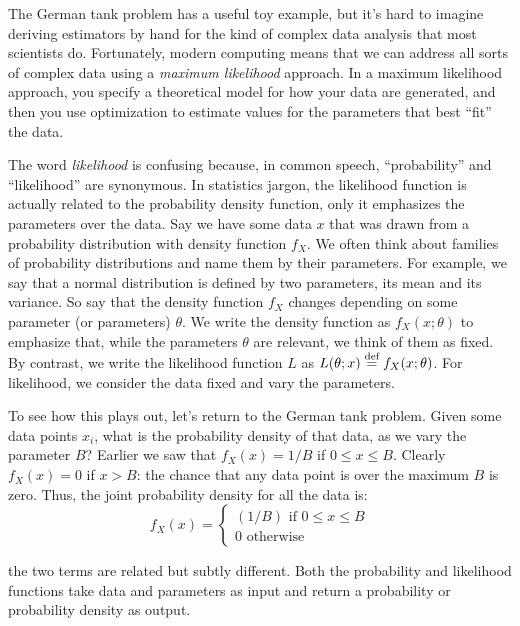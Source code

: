 The German tank problem has a useful toy example, but it's hard to imagine deriving
estimators by hand for the kind of complex data analysis that most scientists do.
Fortunately, modern computing means that we can address all sorts of complex data
using a \emph{maximum likelihood} approach. In a maximum likelihood approach, you
specify a theoretical model for how your data are generated, and then you use optimization to estimate values for the parameters that best ``fit'' the data.

The word \emph{likelihood} is confusing because, in common speech, ``probability''
and ``likelihood'' are synonymous. In statistics jargon, the likelihood function
is actually related to the probability density function, only it emphasizes the
parameters over the data. Say we have some data $x$ that was drawn from a probability 
distribution with density function $f_X$. We often think about families of probability
distributions and name them by their parameters. For example, we say that a normal
distribution is defined by two parameters, its mean and its variance. So say that
the density function $f_X$ changes depending on some parameter (or parameters) $\theta$.
We write the density function as $f_X(x; \theta)$ to emphasize that, while the
parameters $\theta$ are relevant, we think of them as fixed. By contrast, we write
the likelihood function $L$ as $L(\theta; x) \stackrel{\text{def}}{=} f_X(x; \theta)$. For likelihood,
we consider the data fixed and vary the parameters.

To see how this plays out, let's return to the German tank problem. Given some
data points $x_i$, what is the probability density of that data, as we
vary the parameter $B$? Earlier we saw that $f_X(x) = 1/B$ if $0 \leq x \leq B$.
Clearly $f_X(x) = 0$ if $x > B$: the chance that any data point is over the maximum
$B$ is zero. Thus, the joint probability density for all the data is:
\begin{equation*}
    f_X(x) = \begin{cases}
        (1/B) \text{ if $0 \leq x \leq B$} \\
        0 \text{ otherwise}
    \end{cases}
\end{equation*}

\vspace{1in}


the two terms are related
but subtly different. Both the probability and likelihood functions take data
and parameters as input and return a probability or probability density as output.

